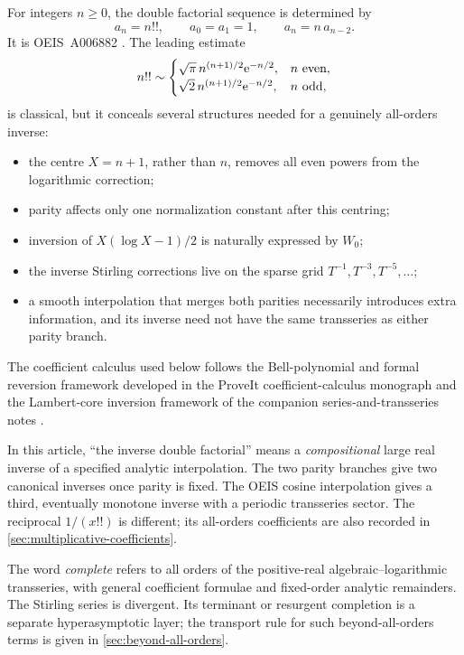 \documentclass[11pt,oneside]{article}
\theoremstyle{plain}
\theoremstyle{definition}
\theoremstyle{remark}
\newcommand{\e}{\mathrm e}
\begin{document}
For integers \(n\geq0\), the double factorial sequence is determined by
\begin{equation}
 a_n=n!!,\qquad a_0=a_1=1,\qquad a_n=n\,a_{n-2}.
 \label{eq:sequence-recurrence}
\end{equation}
It is OEIS~A006882 \cite{OEIS}.  The leading estimate
\[
 n!!\sim
 \begin{cases}
 \sqrt\pi\,n^{(n+1)/2}\e^{-n/2},&n\ \hbox{even},\\
 \sqrt2\,n^{(n+1)/2}\e^{-n/2},&n\ \hbox{odd},
 \end{cases}
\]
is classical, but it conceals several structures needed for a genuinely
all-orders inverse:
\begin{itemize}
\item the centre \(X=n+1\), rather than \(n\), removes all even powers from the
      logarithmic correction;
\item parity affects only one normalization constant after this centring;
\item inversion of \(X(\log X-1)/2\) is naturally expressed by \(W_0\);
\item the inverse Stirling corrections live on the sparse grid
      \(T^{-1},T^{-3},T^{-5},\ldots\);
\item a smooth interpolation that merges both parities necessarily introduces
      extra information, and its inverse need not have the same transseries as
      either parity branch.
\end{itemize}

The coefficient calculus used below follows the Bell-polynomial and formal
reversion framework developed in the ProveIt coefficient-calculus monograph
\cite{ProveItCCC} and the Lambert-core inversion framework of the companion
series-and-transseries notes \cite{ProveItST,ProveItGammaBarnes}.

\begin{warningbox}
In this article, ``the inverse double factorial'' means a \emph{compositional}
large real inverse of a specified analytic interpolation.  The two parity
branches give two canonical inverses once parity is fixed.  The OEIS cosine
interpolation gives a third, eventually monotone inverse with a periodic
transseries sector.  The reciprocal \(1/(x!!)\) is different; its all-orders
coefficients are also recorded in \cref{sec:multiplicative-coefficients}.
\end{warningbox}

The word \emph{complete} refers to all orders of the positive-real
algebraic--logarithmic transseries, with general coefficient formulae and
fixed-order analytic remainders.  The Stirling series is divergent.  Its
terminant or resurgent completion is a separate hyperasymptotic layer; the
transport rule for such beyond-all-orders terms is given in
\cref{sec:beyond-all-orders}.
\end{document}
